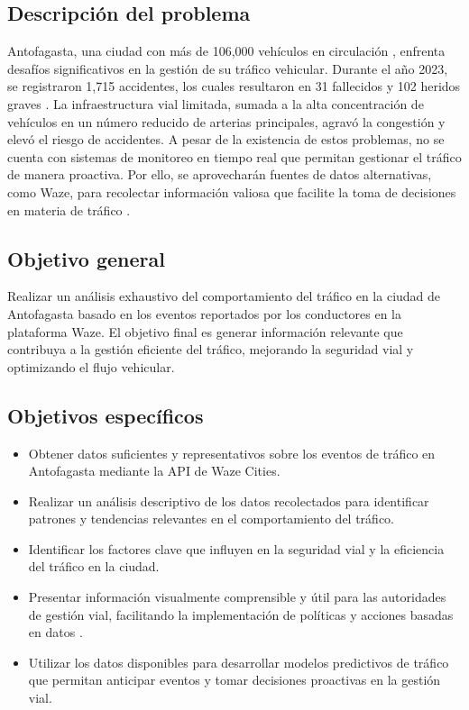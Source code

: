 \documentclass[12pt]{article}
\begin{document}
\subsection{Descripción del problema}

Antofagasta, una ciudad con más de 106,000 vehículos en circulación \parencite{comision2023}, enfrenta desafíos significativos en la gestión de su tráfico vehicular. Durante el año 2023, se registraron 1,715 accidentes, los cuales resultaron en 31 fallecidos y 102 heridos graves \parencite{comision2023}. La infraestructura vial limitada, sumada a la alta concentración de vehículos en un número reducido de arterias principales, agravó la congestión y elevó el riesgo de accidentes. A pesar de la existencia de estos problemas, no se cuenta con sistemas de monitoreo en tiempo real que permitan gestionar el tráfico de manera proactiva. Por ello, se aprovecharán fuentes de datos alternativas, como Waze, para recolectar información valiosa que facilite la toma de decisiones en materia de tráfico \parencite{chen2015}.

\subsection{Objetivo general}

Realizar un análisis exhaustivo del comportamiento del tráfico en la ciudad de Antofagasta basado en los eventos reportados por los conductores en la plataforma Waze. El objetivo final es generar información relevante que contribuya a la gestión eficiente del tráfico, mejorando la seguridad vial y optimizando el flujo vehicular.

\subsection{Objetivos específicos}

\begin{itemize}
    \item Obtener datos suficientes y representativos sobre los eventos de tráfico en Antofagasta mediante la API de Waze Cities.
    \item Realizar un análisis descriptivo de los datos recolectados para identificar patrones y tendencias relevantes en el comportamiento del tráfico.
    \item Identificar los factores clave que influyen en la seguridad vial y la eficiencia del tráfico en la ciudad.
    \item Presentar información visualmente comprensible y útil para las autoridades de gestión vial, facilitando la implementación de políticas y acciones basadas en datos \parencite{auld2009}.
    \item Utilizar los datos disponibles para desarrollar modelos predictivos de tráfico que permitan anticipar eventos y tomar decisiones proactivas en la gestión vial.
\end{itemize}
\end{document}

